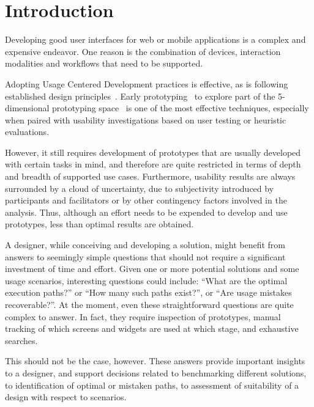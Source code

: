 \documentclass{sigchi}
\begin{document}
 

\section{Introduction}

Developing good user interfaces for web or mobile applications is a
complex and expensive endeavor. One reason is the combination of
devices, interaction modalities and workflows that need to be
supported.

Adopting Usage Centered Development practices is effective, as is
following established design principles~\cite{constantine99}. Early
prototyping~\cite{buxton07} to explore part of the 5-dimensional
prototyping space~\cite{mccurdy06} is one of the most effective
techniques, especially when paired with usability investigations based
on user testing or heuristic evaluations.

However, it still requires development of prototypes that are usually
developed with certain tasks in mind, and therefore are quite
restricted in terms of depth and breadth of supported use
cases. Furthermore, usability results are always surrounded by a cloud
of uncertainty, due to subjectivity introduced by participants and
facilitators or by other contingency factors involved in the
analysis. Thus, although an effort needs to be expended to develop and
use prototypes, less than optimal results are obtained.

A designer, while conceiving and developing a solution, might benefit
from answers to seemingly simple questions that should not require a
significant investment of time and effort. Given one or more potential
solutions and some usage scenarios, interesting questions could
include: ``What are the optimal execution paths?'' or ``How many such
paths exist?'', or ``Are usage mistakes recoverable?''. At the moment,
even these straightforward questions are quite complex to answer. In
fact, they require inspection of prototypes, manual tracking of which
screens and widgets are used at which stage, and exhaustive searches.

This should not be the case, however. These answers provide important
insights to a designer, and support decisions related to benchmarking
different solutions, to identification of optimal or mistaken paths,
to assessment of suitability of a design with respect to scenarios.
\end{document}
